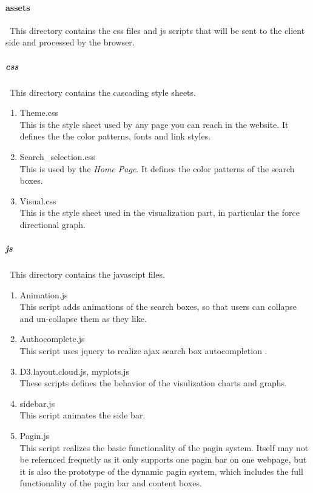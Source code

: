 \documentclass[a4paper, 10pt]{article}
\begin{document}
\paragraph{assets}\
This directory contains the css files and js scripts that will be sent to the client side and processed by the browser.
\subparagraph{css}\
This directory contains the cascading style sheets.
\begin{enumerate}
\item Theme.css\\
  This is the style sheet used by any page you can reach in the website. It defines the the color patterns, fonts and link styles.
\item Search\_selection.css\\
  This is used by the \textit{Home Page}. It defines the color patterns of the search boxes.
\item Visual.css\\
  This is the style sheet used in the visualization part, in particular the force directional graph.
\end{enumerate}
\subparagraph{js}\
This directory contains the javascipt files.
\begin{enumerate}
\item Animation.js\\
  This script adds animations of the search boxes, so that users can collapse and un-collapse them as they like.
\item Authocomplete.js\\
  This script uses jquery to realize ajax search box autocompletion .
\item D3.layout.cloud.js, myplots.js\\
  These scripts defines the behavior of the visulization charts and graphs.
\item sidebar.js\\
  This script animates the side bar.
\item Pagin.js\\
  This script realizes the basic functionality of the pagin system. Itself may not be refernced frequetly as it only supports one pagin bar on one webpage, but it is also the prototype of the dynamic pagin system, which includes the full functionality of the pagin bar and content boxes. 
\end{enumerate}
\end{document}
